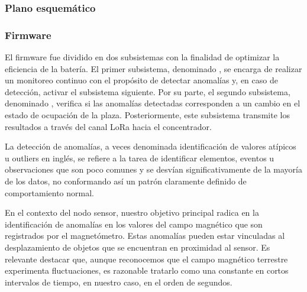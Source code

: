 
\newpage
\subsubsection{Plano esquemático}



\subsubsection{Firmware}
El firmware fue dividido en dos subsistemas con la finalidad de optimizar la eficiencia de la batería. El primer subsistema, denominado , se encarga de realizar un monitoreo continuo con el propósito de detectar anomalías y, en caso de detección, activar el subsistema siguiente. Por su parte, el segundo subsistema, denominado , verifica si las anomalías detectadas corresponden a un cambio en el estado de ocupación de la plaza. Posteriormente, este subsistema transmite los resultados a través del canal LoRa hacia el concentrador.



\label{detector_anomalias}
La detección de anomalías, a veces denominada identificación de valores atípicos u outliers en inglés, se refiere a la tarea de identificar elementos, eventos u observaciones que son poco comunes y se desvían significativamente de la mayoría de los datos, no conformando así un patrón claramente definido de comportamiento normal.

En el contexto del nodo sensor, nuestro objetivo principal radica en la identificación de anomalías en los valores del campo magnético que son registrados por el magnetómetro. Estas anomalías pueden estar vinculadas al desplazamiento de objetos que se encuentran en proximidad al sensor. Es relevante destacar que, aunque reconocemos que el campo magnético terrestre experimenta fluctuaciones, es razonable tratarlo como una constante en cortos intervalos de tiempo, en nuestro caso, en el orden de segundos.

